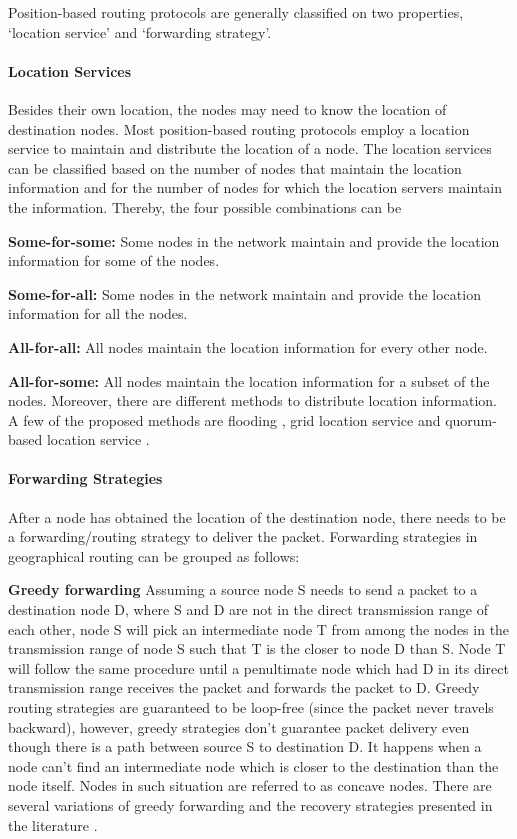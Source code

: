Position-based routing protocols are generally classified on two properties, `location service' and `forwarding strategy'.

\paragraph{Location Services} \label{loc_service}
Besides their own location, the nodes may need to know the location of destination nodes. Most position-based routing protocols employ a location service to maintain and distribute the location of a node. The location services can be classified based on the number of nodes that maintain the location information and for the number of nodes for which the location servers maintain the information. Thereby, the four possible combinations can be \cite{967595}

\textbf{Some-for-some:} Some nodes in the network maintain and provide the location information for some of the nodes.

\textbf{Some-for-all:} Some nodes in the network maintain and provide the location information for all the nodes.

\textbf{All-for-all:} All nodes maintain the location information for every other node.

\textbf{All-for-some:} All nodes maintain the location information for a subset of the nodes. 
Moreover, there are different methods to distribute location information. A few of the proposed methods are flooding \cite{Basagni:1998:DRE:288235.288254}, grid location service \cite{Li:2000:SLS:345910.345931} and quorum-based location service \cite{769770}.

\paragraph{Forwarding Strategies}
After a node has obtained the location of the destination node, there needs to be a forwarding/routing strategy to deliver the packet. Forwarding strategies in geographical routing can be grouped as follows:

\textbf{Greedy forwarding} Assuming a source node S needs to send a packet to a destination node D, where S and D are not in the direct transmission range of each other, node S will pick an intermediate node T from among the nodes in the transmission range of node S such that T is the closer to node D than S. Node T will follow the same procedure until a penultimate node which had D in its direct transmission range receives the packet and forwards the packet to D. 
Greedy routing strategies are guaranteed to be loop-free (since the packet never travels backward), however, greedy strategies don't guarantee packet delivery even though there is a path between source S to destination D. It happens when a node can't find an intermediate node which is closer to the destination than the node itself. Nodes in such situation are referred to as concave nodes. There are several variations of greedy forwarding and the recovery strategies presented in the literature \cite{OUBBATI201729} \cite{6238283} \cite{967595} \cite{Stojmenovic:2002:PRA:2288474.2290160}.

